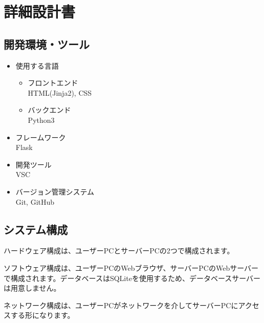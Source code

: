 \documentclass[a4paper, 11pt, titlepage]{jsarticle}
\begin{document}
\section{詳細設計書}

\subsection{開発環境・ツール}
\begin{itemize}
  \item 使用する言語
  \begin{itemize}
    \item フロントエンド\\
    HTML(Jinja2), CSS
    \item バックエンド\\
    Python3
  \end{itemize}
  \item フレームワーク\\
  Flask
  \item 開発ツール\\
  VSC
  \item バージョン管理システム\\
  Git, GitHub
\end{itemize}

\subsection{システム構成}
ハードウェア構成は、ユーザーPCとサーバーPCの2つで構成されます。

ソフトウェア構成は、ユーザーPCのWebブラウザ、サーバーPCのWebサーバーで構成されます。データベースはSQLiteを使用するため、データベースサーバーは用意しません。

ネットワーク構成は、ユーザーPCがネットワークを介してサーバーPCにアクセスする形になります。
\end{document}
